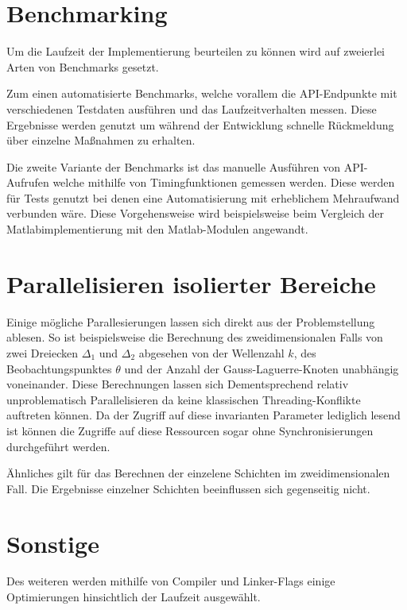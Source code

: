 \section{Benchmarking}


Um die Laufzeit der Implementierung beurteilen zu können wird auf zweierlei Arten von Benchmarks gesetzt.

Zum einen automatisierte Benchmarks, welche vorallem die API-Endpunkte mit verschiedenen Testdaten ausführen und das Laufzeitverhalten messen.
Diese Ergebnisse werden genutzt um während der Entwicklung schnelle Rückmeldung über einzelne Maßnahmen zu erhalten.

Die zweite Variante der Benchmarks ist das manuelle Ausführen von API-Aufrufen welche mithilfe von Timingfunktionen gemessen werden.
Diese werden für Tests genutzt bei denen eine Automatisierung mit erheblichem Mehraufwand verbunden wäre.
Diese Vorgehensweise wird beispielsweise beim Vergleich der Matlabimplementierung mit den Matlab-Modulen angewandt. 

\section{Parallelisieren isolierter Bereiche}

Einige mögliche Parallesierungen lassen sich direkt aus der Problemstellung ablesen. 
So ist beispielsweise die Berechnung des zweidimensionalen Falls von zwei Dreiecken $\Delta_1$ und $\Delta_2$ abgesehen von 
der Wellenzahl $k$, des Beobachtungspunktes $\theta$ und der Anzahl der Gauss-Laguerre-Knoten unabhängig voneinander.
Diese Berechnungen lassen sich Dementsprechend relativ unproblematisch Parallelisieren da keine klassischen Threading-Konflikte auftreten können.
Da der Zugriff auf diese invarianten Parameter lediglich lesend ist können die Zugriffe auf diese Ressourcen sogar ohne Synchronisierungen durchgeführt werden.

Ähnliches gilt für das Berechnen der einzelene Schichten im zweidimensionalen Fall. Die Ergebnisse einzelner Schichten beeinflussen sich gegenseitig nicht.

\section{Sonstige}

Des weiteren werden mithilfe von Compiler und Linker-Flags einige Optimierungen hinsichtlich der Laufzeit ausgewählt.
